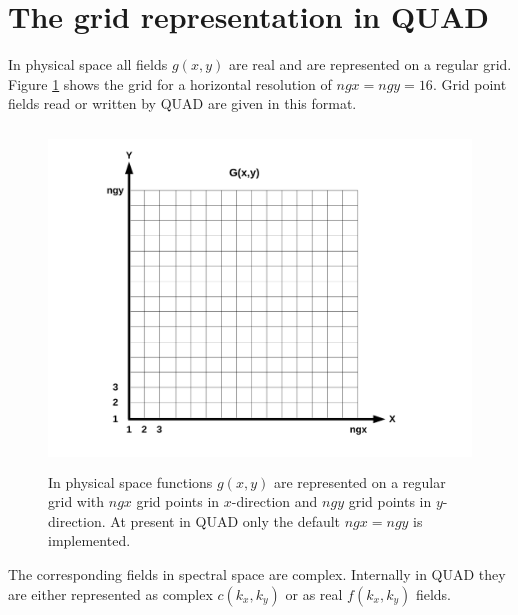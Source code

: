 %
\section{The grid representation in QUAD}
%
\label{ssec_Grids}
In physical space all fields $g(x,y)$ are real and are represented on a regular 
grid. Figure \ref{fig_physgrid} shows the grid for a horizontal 
resolution of $ngx = ngy = 16$. Grid point fields read or written by QUAD
are given in this format.
\begin{figure} \label{fig_physgrid}
   \includegraphics[height=9cm]{figures/phys_grid.pdf}
   \caption{In physical space functions $g(x,y)$ are represented on a
            regular grid with $ngx$ grid points in $x$-direction and 
            $ngy$ grid points in $y$-direction. At present in QUAD only
            the default $ngx = ngy$ is implemented.}
\end{figure}
The corresponding fields in spectral space are complex. Internally in QUAD 
they are either represented as complex $c(k_{x},k_{y})$ or as real 
$f(k_{x},k_{y})$ fields. 
